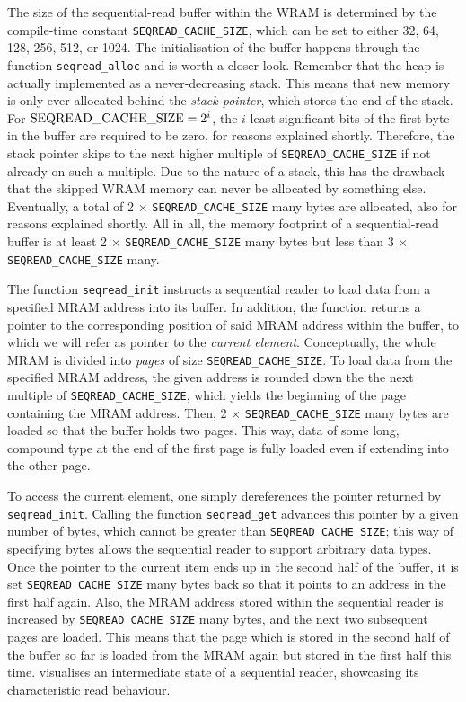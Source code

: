 The size of the sequential-read buffer within the WRAM is determined by the compile-time constant \lstinline|SEQREAD_CACHE_SIZE|, which can be set to either 32, 64, 128, 256, 512, or 1024.
The initialisation of the buffer happens through the function \lstinline|seqread_alloc| and is worth a closer look.
Remember that the heap is actually implemented as a never-decreasing stack.
This means that new memory is only ever allocated behind the \emph{stack pointer}, which stores the end of the stack.
For \(\text{\lstinline|SEQREAD_CACHE_SIZE|} = 2^i\), the \(i\) least significant bits of the first byte in the buffer are required to be zero, for reasons explained shortly.
Therefore, the stack pointer skips to the next higher multiple of \lstinline|SEQREAD_CACHE_SIZE| if not already on such a multiple.
Due to the nature of a stack, this has the drawback that the skipped WRAM memory can never be allocated by something else.
Eventually, a total of 2 × \lstinline|SEQREAD_CACHE_SIZE| many bytes are allocated, also for reasons explained shortly.
All in all, the memory footprint of a sequential-read buffer is at least 2 × \lstinline|SEQREAD_CACHE_SIZE| many bytes but less than 3 × \lstinline|SEQREAD_CACHE_SIZE| many.

The function \lstinline|seqread_init| instructs a sequential reader to load data from a specified MRAM address into its buffer.
In addition, the function returns a pointer to the corresponding position of said MRAM address within the buffer, to which we will refer as pointer to the \emph{current element}.
Conceptually, the whole MRAM is divided into \emph{pages} of size \lstinline|SEQREAD_CACHE_SIZE|.
To load data from the specified MRAM address, the given address is rounded down the the next multiple of \lstinline|SEQREAD_CACHE_SIZE|, which yields the beginning of the page containing the MRAM address.
Then, 2 × \lstinline|SEQREAD_CACHE_SIZE| many bytes are loaded so that the buffer holds two pages.
This way, data of some long, compound type at the end of the first page is fully loaded even if extending into the other page.

To access the current element, one simply dereferences the pointer returned by \lstinline|seqread_init|.
Calling the function \lstinline|seqread_get| advances this pointer by a given number of bytes, which cannot be greater than \lstinline|SEQREAD_CACHE_SIZE|;
this way of specifying bytes allows the sequential reader to support arbitrary data types.
Once the pointer to the current item ends up in the second half of the buffer, it is set \lstinline|SEQREAD_CACHE_SIZE| many bytes back so that it points to an address in the first half again.
Also, the MRAM address stored within the sequential reader is increased by \lstinline|SEQREAD_CACHE_SIZE| many bytes, and the next two subsequent pages are loaded.
This means that the page which is stored in the second half of the buffer so far is loaded from the MRAM again but stored in the first half this time.
 visualises an intermediate state of a sequential reader, showcasing its characteristic read behaviour.

